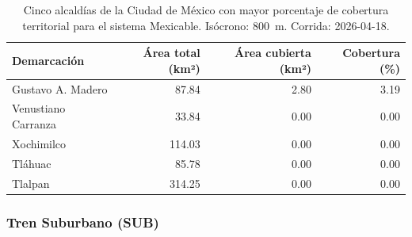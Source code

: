 \begin{table}[H]
    \centering
    \caption[Alcaldías con mayor cobertura de Mexicable (CDMX)]{
    Cinco alcaldías de la Ciudad de México con mayor porcentaje de cobertura
    territorial para el sistema Mexicable. Isócrono: 800~m.
    Corrida: 2026-04-18.}
    \label{tab:cobertura-mexicable-cdmx}
    \begin{tabular}{|l|r|r|r|}
        \hline
        \textbf{Demarcación} & \textbf{Área total (km²)} & \textbf{Área cubierta (km²)} & \textbf{Cobertura (\%)} \\
        \hline
        Gustavo A. Madero   &  87.84 & 2.80 & 3.19 \\
        Venustiano Carranza &  33.84 & 0.00 & 0.00 \\
        Xochimilco          & 114.03 & 0.00 & 0.00 \\
        Tláhuac             &  85.78 & 0.00 & 0.00 \\
        Tlalpan             & 314.25 & 0.00 & 0.00 \\
        \hline
    \end{tabular}
\end{table}

\DIFdelbegin {}%

{%
}

\DIFdelend \subsubsection{Tren Suburbano (SUB)}
\label{subsubsec:cobertura-sub}

